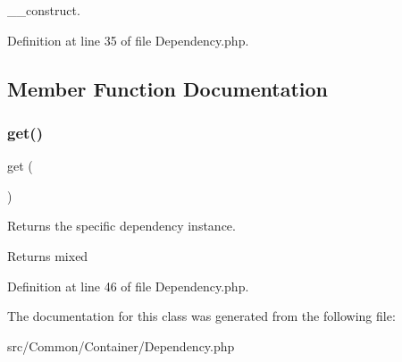 \+\_\+\+\_\+construct. 

Definition at line 35 of file Dependency.\+php.



\subsection{Member Function Documentation}
\mbox{\label{class_zest_1_1_common_1_1_container_1_1_dependency_ac33ee765f5ad9f134540bac393721cfe}} 
\subsubsection{\texorpdfstring{get()}{get()}}
{\footnotesize\ttfamily get (\begin{DoxyParamCaption}{ }\end{DoxyParamCaption})}

Returns the specific dependency instance.

\begin{DoxyReturn}{Returns}
mixed 
\end{DoxyReturn}


Definition at line 46 of file Dependency.\+php.



The documentation for this class was generated from the following file\+:\begin{DoxyCompactItemize}
\item 
src/\+Common/\+Container/Dependency.\+php\end{DoxyCompactItemize}
